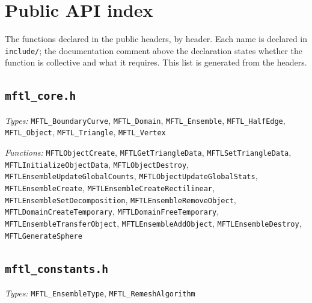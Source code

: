 \chapter{Public API index}
\label{app:api}
\raggedright

The functions declared in the public headers, by header. Each name is declared in
\texttt{include/}; the documentation comment above the declaration states whether the function is
collective and what it requires. This list is generated from the headers.

\section*{\texttt{mftl\_core.h}}
\textit{Types:} \texttt{MFTL\_BoundaryCurve}, \texttt{MFTL\_Domain}, \texttt{MFTL\_Ensemble}, \texttt{MFTL\_HalfEdge}, \texttt{MFTL\_Object}, \texttt{MFTL\_Triangle}, \texttt{MFTL\_Vertex}\par
\textit{Functions:} \texttt{MFTLObjectCreate}, \texttt{MFTLGetTriangleData}, \texttt{MFTLSetTriangleData}, \texttt{MFTLInitializeObjectData}, \texttt{MFTLObjectDestroy}, \texttt{MFTLEnsembleUpdateGlobalCounts}, \texttt{MFTLObjectUpdateGlobalStats}, \texttt{MFTLEnsembleCreate}, \texttt{MFTLEnsembleCreateRectilinear}, \texttt{MFTLEnsembleSetDecomposition}, \texttt{MFTLEnsembleRemoveObject}, \texttt{MFTLDomainCreateTemporary}, \texttt{MFTLDomainFreeTemporary}, \texttt{MFTLEnsembleTransferObject}, \texttt{MFTLEnsembleAddObject}, \texttt{MFTLEnsembleDestroy}, \texttt{MFTLGenerateSphere}\par

\section*{\texttt{mftl\_constants.h}}
\textit{Types:} \texttt{MFTL\_EnsembleType}, \texttt{MFTL\_RemeshAlgorithm}\par

